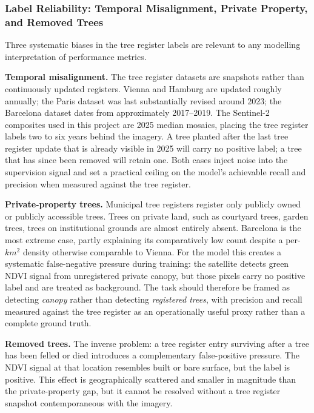 \subsubsection{Label Reliability: Temporal Misalignment, Private Property, and Removed Trees}
\label{sec:label-reliability}
Three systematic biases in the tree register labels are relevant to any modelling interpretation of performance metrics.

\textbf{Temporal misalignment.}
The tree register datasets are snapshots rather than continuously updated registers. Vienna and Hamburg are updated roughly annually; the Paris dataset was last substantially revised around 2023; the Barcelona dataset dates from approximately 2017--2019. The Sentinel-2 composites used in this project are 2025 median mosaics, placing the tree register labels two to six years behind the imagery. A tree planted after the last tree register update that is already visible in 2025 will carry no positive label; a tree that has since been removed will retain one. Both cases inject noise into the supervision signal and set a practical ceiling on the model's achievable recall and precision when measured against the tree register.

\textbf{Private-property trees.}
Municipal tree registers register only publicly owned or publicly accessible trees. Trees on private land, such as courtyard trees, garden trees, trees on institutional grounds are almost entirely absent. Barcelona is the most extreme case, partly explaining its comparatively low count despite a per-$km^2$ density otherwise comparable to Vienna. For the model this creates a systematic false-negative pressure during training: the satellite detects green NDVI signal from unregistered private canopy, but those pixels carry no positive label and are treated as background. The task should therefore be framed as detecting \emph{canopy} rather than detecting \emph{registered trees}, with precision and recall measured against the tree register as an operationally useful proxy rather than a complete ground truth.

\textbf{Removed trees.}
The inverse problem: a tree register entry surviving after a tree has been felled or died introduces a complementary false-positive pressure. The NDVI signal at that location resembles built or bare surface, but the label is positive. This effect is geographically scattered and smaller in magnitude than the private-property gap, but it cannot be resolved without a tree register snapshot contemporaneous with the imagery.

